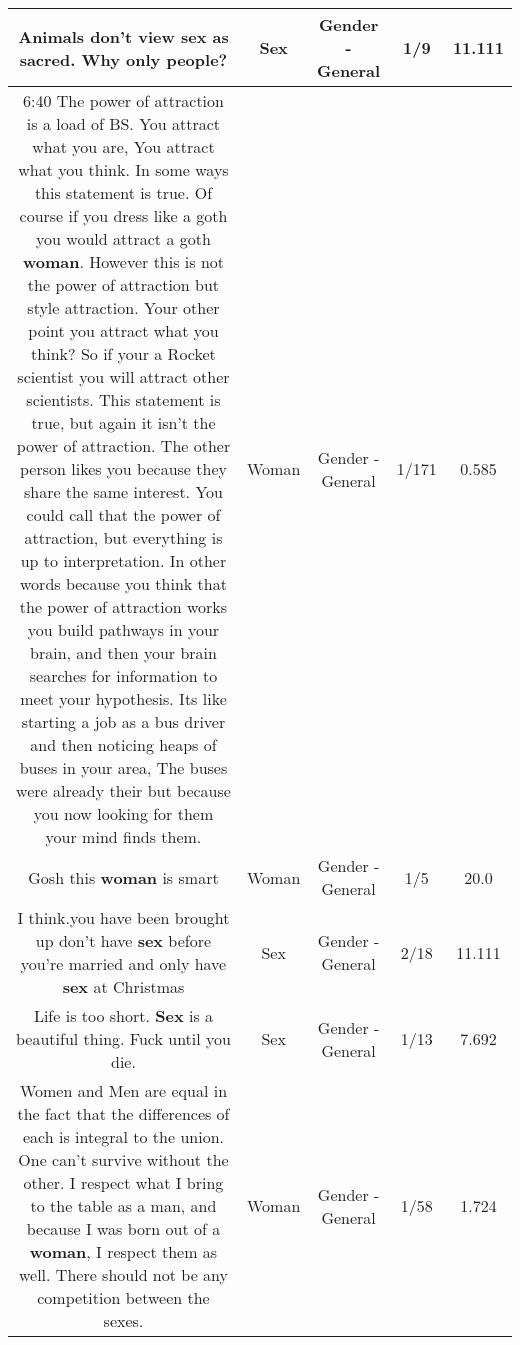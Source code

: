 \documentclass[11pt]{article}
\newlength\mylength
\begin{document}
\begin{center}
\begin{longtable}{|C{.65\mylength}|C{.30\mylength}|C{.12\mylength}|C{.12\mylength}|C{.12\mylength}|}
  \small Animals don't view \textbf{sex} as sacred. Why only people?\normalsize   & Sex & Gender - General & 1/9 & 11.111 \\  \hline
  \small 6:40 The power of attraction is a load of BS.  You attract what you are, You attract what you think.  In some ways this statement is true.  Of course if you dress like a goth you would attract a  goth \textbf{woman}.  However this is not the power of attraction but style attraction.  Your other point you attract what you think? So if your a Rocket scientist you will attract other scientists. This statement is true, but again it isn't the power of attraction.  The other person likes you because they share the same interest. You could call that the power of attraction, but everything is up to interpretation.  In other words because you think that the power of attraction works you build pathways in your brain, and then your brain searches for information to meet your hypothesis.  Its like starting a job as a bus driver and then noticing heaps of buses in your area,  The buses were already their but because you now looking for them your mind finds them.\normalsize   & Woman & Gender - General & 1/171 & 0.585 \\  \hline
  \small Gosh this \textbf{woman} is smart\normalsize   & Woman & Gender - General & 1/5 & 20.0 \\  \hline
  \small I think.you have been brought up don't have \textbf{sex} before you're married and only have \textbf{sex} at Christmas\normalsize   & Sex & Gender - General & 2/18 & 11.111 \\  \hline
  \small Life is too short. \textbf{Sex} is a beautiful thing. Fuck until you die.\normalsize   & Sex & Gender - General & 1/13 & 7.692 \\  \hline
  \small Women and Men are equal in the fact that the differences of each is integral to the union. One can't survive without the other. I respect what I bring to the table as a man, and because I was born out of a \textbf{woman}, I respect them as well. There should not be any competition between the sexes.\normalsize   & Woman & Gender - General & 1/58 & 1.724 \\  \hline

\end{longtable}
\end{center}
\end{document}
